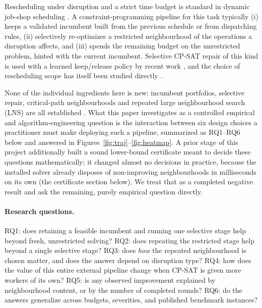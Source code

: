 \documentclass[letterpaper]{article} %
\begin{document}
Rescheduling under disruption and a strict time budget is standard in dynamic job-shop scheduling \citep{vieira2003,ouelhadj2009}. A constraint-programming pipeline for this task typically (i) keeps a validated incumbent built from the previous schedule or from dispatching rules, (ii) selectively re-optimizes a restricted neighbourhood of the operations a disruption affects, and (iii) spends the remaining budget on the unrestricted problem, hinted with the current incumbent. Selective CP-SAT repair of this kind is used with a learned keep/release policy by recent work \citep{linyang2026}, and the choice of rescheduling scope has itself been studied directly \citep{sun2026}.

None of the individual ingredients here is new: incumbent portfolios, selective repair, critical-path neighbourhoods and repeated large neighbourhood search (LNS) are all established \citep{balas1969,vanlaarhoven1992,nowicki1996,shaw1998,godard2005,gomes2001}. What this paper investigates as a controlled empirical and algorithm-engineering question is the interaction between six design choices a practitioner must make deploying such a pipeline, summarized as RQ1--RQ6 below and answered in Figures~\ref{fig:traj}--\ref{fig:heatmap}. A prior stage of this project additionally built a sound lower-bound certificate meant to decide these questions mathematically; it changed almost no decisions in practice, because the installed solver already disposes of non-improving neighbourhoods in milliseconds on its own (the certificate section below). We treat that as a completed negative result and ask the remaining, purely empirical question directly.

\paragraph{Research questions.} RQ1: does retaining a feasible incumbent and running one selective stage help beyond fresh, unrestricted solving? RQ2: does repeating the restricted stage help beyond a single selective stage? RQ3: does \emph{how} the repeated neighbourhood is chosen matter, and does the answer depend on disruption type? RQ4: how does the value of this entire external pipeline change when CP-SAT is given more workers of its own? RQ5: is any observed improvement explained by neighbourhood content, or by the number of completed rounds? RQ6: do the answers generalize across budgets, severities, and published benchmark instances?
\end{document}
